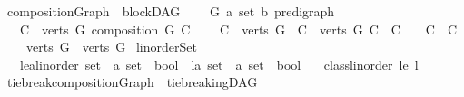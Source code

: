 \begin{isabellebody}
\isanewline
{}\isamarkupfalse%
\ compositionGraph\ {\isacharequal}{\kern0pt}\ blockDAG\ {\isacharplus}{\kern0pt}\isanewline
\ \ \ G{\isacharprime}{\kern0pt}\ {\isacharcolon}{\kern0pt}{\isacharcolon}{\kern0pt}{\isachardoublequoteopen}{\isacharparenleft}{\kern0pt}{\isacharprime}{\kern0pt}a\ set{\isacharcomma}{\kern0pt}\ {\isacharprime}{\kern0pt}b{\isacharparenright}{\kern0pt}\ pre{\isacharunderscore}{\kern0pt}digraph{\isachardoublequoteclose}\isanewline
\ \ \ {\isachardoublequoteopen}{\isasymforall}C\ {\isasymin}\ {\isacharparenleft}{\kern0pt}verts\ G{\isacharprime}{\kern0pt}{\isacharparenright}{\kern0pt}{\isachardot}{\kern0pt}\ composition\ G\ C{\isachardoublequoteclose}\isanewline
\ \ \ {\isachardoublequoteopen}{\isasymforall}\ C{}\ {\isasymin}\ {\isacharparenleft}{\kern0pt}verts\ G{\isacharprime}{\kern0pt}{\isacharparenright}{\kern0pt}{\isachardot}{\kern0pt}\ {\isasymforall}\ C{}\ {\isasymin}\ {\isacharparenleft}{\kern0pt}verts\ G{\isacharprime}{\kern0pt}{\isacharparenright}{\kern0pt}{\isachardot}{\kern0pt}\ C{}\ {\isasyminter}\ C{}\ {\isasymnoteq}\ {\isacharbraceleft}{\kern0pt}{\isacharbraceright}{\kern0pt}\ {\isasymlongrightarrow}\ C{}\ {\isacharequal}{\kern0pt}\ C{}{\isachardoublequoteclose}\isanewline
\ \ \ {\isachardoublequoteopen}{\isasymUnion}\ {\isacharparenleft}{\kern0pt}verts\ G{\isacharprime}{\kern0pt}{\isacharparenright}{\kern0pt}\ {\isacharequal}{\kern0pt}\ verts\ G{\isachardoublequoteclose}\isanewline
\isanewline
\isanewline
{}\isamarkupfalse%
\ linorderSet\ {\isacharequal}{\kern0pt}\ \isanewline
\ \ \ le{\isacharcolon}{\kern0pt}{\isacharcolon}{\kern0pt}{\isachardoublequoteopen}{\isacharprime}{\kern0pt}a{\isacharcolon}{\kern0pt}{\isacharcolon}{\kern0pt}linorder\ set\ {\isasymRightarrow}\ {\isacharprime}{\kern0pt}a\ set\ {\isasymRightarrow}\ bool{\isachardoublequoteclose}\ \ l{\isacharcolon}{\kern0pt}{\isacharcolon}{\kern0pt}{\isachardoublequoteopen}{\isacharprime}{\kern0pt}a\ set\ {\isasymRightarrow}\ {\isacharprime}{\kern0pt}a\ set\ {\isasymRightarrow}\ bool{\isachardoublequoteclose}\isanewline
\ \ \ {\isachardoublequoteopen}class{\isachardot}{\kern0pt}linorder\ le\ l{\isachardoublequoteclose}\isanewline
\isanewline
{}\isamarkupfalse%
\ tie{\isacharunderscore}{\kern0pt}break{\isacharunderscore}{\kern0pt}compositionGraph\ {\isacharequal}{\kern0pt}\ tie{\isacharunderscore}{\kern0pt}breakingDAG\ {\isacharplus}{\kern0pt}\ \isanewline

\end{isabellebody}
